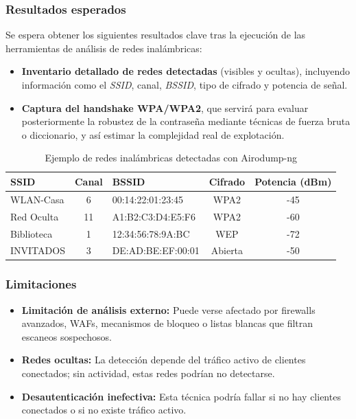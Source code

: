 \documentclass[a4paper, 11pt]{article}
\begin{document}
\subsubsection*{Resultados esperados}

Se espera obtener los siguientes resultados clave tras la ejecución de las herramientas de análisis de redes inalámbricas:

\begin{itemize}
    \item \textbf{Inventario detallado de redes detectadas} (visibles y ocultas), incluyendo información como el \textit{SSID}, canal, \textit{BSSID}, tipo de cifrado y potencia de señal.
    
    \item \textbf{Captura del handshake WPA/WPA2}, que servirá para evaluar posteriormente la robustez de la contraseña mediante técnicas de fuerza bruta o diccionario, y así estimar la complejidad real de explotación.
\end{itemize}

\vspace{1em}

\begin{table}[H]
\centering
\renewcommand{\arraystretch}{1.2}
\begin{tabular}{|l|c|l|c|c|}
\hline
\textbf{SSID} & \textbf{Canal} & \textbf{BSSID} & \textbf{Cifrado} & \textbf{Potencia (dBm)} \\
\hline
WLAN-Casa     & 6      & 00:14:22:01:23:45 & WPA2 & -45 \\
Red Oculta    & 11     & A1:B2:C3:D4:E5:F6 & WPA2 & -60 \\
Biblioteca    & 1      & 12:34:56:78:9A:BC & WEP      & -72 \\
INVITADOS     & 3      & DE:AD:BE:EF:00:01 & Abierta  & -50 \\
\hline
\end{tabular}
\caption{Ejemplo de redes inalámbricas detectadas con Airodump-ng}
\label{tab:redes_detectadas}
\end{table}
\subsubsection*{Limitaciones}

\begin{itemize}
    \item \textbf{Limitación de análisis externo:} Puede verse afectado por firewalls avanzados, WAFs, mecanismos de bloqueo o listas blancas que filtran escaneos sospechosos.
    
    \item \textbf{Redes ocultas:} La detección depende del tráfico activo de clientes conectados; sin actividad, estas redes podrían no detectarse.
    
    \item \textbf{Desautenticación inefectiva:} Esta técnica podría fallar si no hay clientes conectados o si no existe tráfico activo.
\end{itemize}
\end{document}
